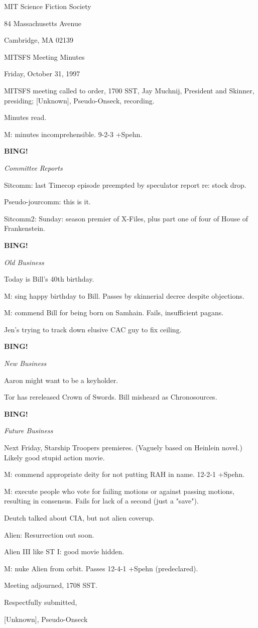 \documentclass[12pt]{article}
\newcommand{\bing}{{\bf BING!} }
\newcommand{\goto}[1]{\bing \vskip 12pt \centerline{{\em{#1}}}}
\begin{document}
\begin{center}

MIT Science Fiction Society 

84 Massachusetts Avenue

Cambridge, MA 02139

\vspace{12pt}

MITSFS Meeting Minutes 

Friday, October 31, 1997

\end{center}
 
\vspace{18pt}

\setlength{\parskip}{6pt}

\noindent
MITSFS meeting called to order, 1700 SST,
Jay Muchnij, President and Skinner, presiding; [Unknown], Pseudo-Onseck, recording.

Minutes read.

M: minutes incomprehensible. 9-2-3 +Spehn.

\goto{Committee Reports}

Sitcomm: last Timecop episode preempted by speculator report re: stock drop.

Pseudo-jourcomm: this is it.

Sitcomm2: Sunday: season premier of X-Files, plus part one of four of House of Frankenstein.

\goto{Old Business}

Today is Bill's 40th birthday.

M: sing happy birthday to Bill. Passes by skinnerial decree despite objections.

M: commend Bill for being born on Samhain. Fails, insufficient pagans.

Jen's trying to track down elusive CAC guy to fix ceiling.

\goto{New Business}

Aaron might want to be a keyholder.

Tor has rereleased Crown of Swords. Bill misheard as Chronosources.

\goto{Future Business}

Next Friday, Starship Troopers premieres. (Vaguely based on Heinlein novel.) Likely good stupid action movie.

M: commend appropriate deity for not putting RAH in name. 12-2-1 +Spehn.

M: execute people who vote for failing motions or against passing motions, resulting in consensus. Fails for lack of a second (just a "save").

Deutch talked about CIA, but not alien coverup.

Alien: Resurrection out soon.

Alien III like ST I: good movie hidden.

M: nuke Alien from orbit. Passes 12-4-1 +Spehn (predeclared).

\vspace{12pt}

\noindent
Meeting adjourned, 1708 SST.

\vspace{18pt}

\centerline{Respectfully submitted,}
\centerline{[Unknown], Pseudo-Onseck}
\end{document}
